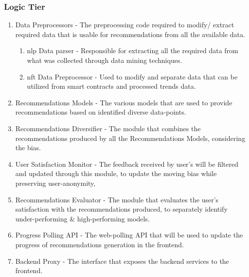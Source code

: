 \subsubsection{Logic Tier}
\begin{enumerate}
    \item Data Preprocessors - The preprocessing code required to modify/ extract required data that is usable for recommendations from all the available data.
    \begin{enumerate}
        \item \gls{nlp} Data parser - Responsible for extracting all the required data from what was collected through data mining techniques.
        \item \gls{nft} Data Preprocessor - Used to modify and separate data that can be utilized from smart contracts and processed trends data.
    \end{enumerate}
    \item Recommendations Models - The various models that are used to provide recommendations based on identified diverse data-points.
    \item Recommendations Diversifier - The module that combines the recommendations produced by all the Recommendations Models, considering the bias.
    \item User Satisfaction Monitor - The feedback received by user's will be filtered and updated through this module, to update the moving bias while preserving user-anonymity,
    \item Recommendations Evaluator - The module that evaluates the user's satisfaction with the recommendations produced, to separately identify under-performing \& high-performing models.
    \item Progress Polling API - The web-polling API that will be used to update the progress of recommendations generation in the frontend.
    \item Backend Proxy - The interface that exposes the backend services to the frontend.
\end{enumerate}

